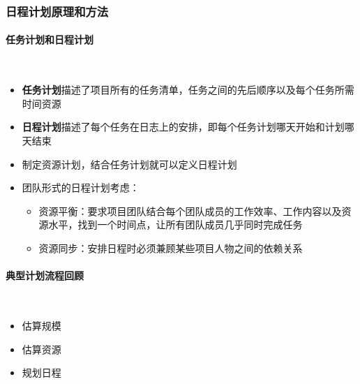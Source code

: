 \subsubsection{日程计划原理和方法}
\paragraph{任务计划和日程计划}~{} \par
\begin{itemize}
    \item \textbf{任务计划}描述了项目所有的任务清单，任务之间的先后顺序以及每个任务所需时间资源
    \item \textbf{日程计划}描述了每个任务在日志上的安排，即每个任务计划哪天开始和计划哪天结束
    \item 制定资源计划，结合任务计划就可以定义日程计划
    \item 团队形式的日程计划考虑：
    \begin{itemize}
        \item 资源平衡：要求项目团队结合每个团队成员的工作效率、工作内容以及资源水平，找到一个时间点，让所有团队成员几乎同时完成任务
        \item 资源同步：安排日程时必须兼顾某些项目人物之间的依赖关系
    \end{itemize}
\end{itemize}

\paragraph{典型计划流程回顾}~{} \par
\vspace{-0.8em}
\begin{multicols}{3}
    \begin{itemize}
        \item 估算规模
        \item 估算资源
        \item 规划日程
    \end{itemize}
\end{multicols}
\vspace{-1em}

